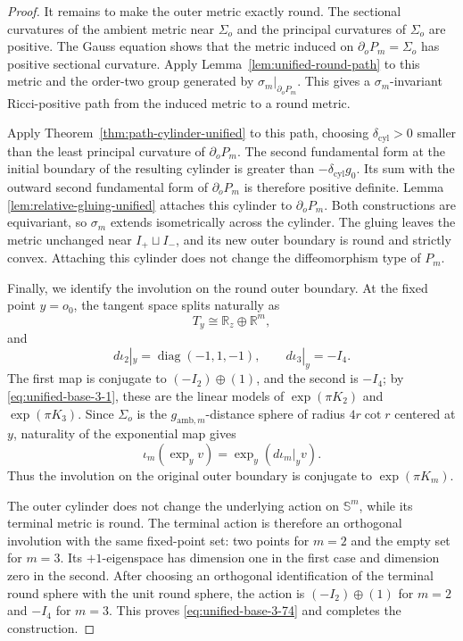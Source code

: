 \documentclass[11pt,reqno]{amsart}
\theoremstyle{definition}
\numberwithin{equation}{section}
\begin{document}
\begin{proof}
It remains to make the outer metric exactly round.  The sectional
curvatures of the ambient metric near $\Sigma_o$ and the principal
curvatures of $\Sigma_o$ are positive.  The Gauss equation shows that
the metric induced on $\partial_oP_m=\Sigma_o$ has positive sectional
curvature.  Apply Lemma~\ref{lem:unified-round-path} to this metric and
the order-two group generated by $\sigma_m|_{\partial_oP_m}$.  This
gives a $\sigma_m$-invariant Ricci-positive path from the induced metric
to a round metric.

Apply Theorem~\ref{thm:path-cylinder-unified} to this path, choosing
$\delta_{\mathrm{cyl}}>0$ smaller than the least principal curvature of
$\partial_oP_m$.  The second fundamental form at the initial boundary
of the resulting cylinder is greater than
$-\delta_{\mathrm{cyl}}g_0$.  Its sum with the outward second fundamental form of
$\partial_oP_m$ is therefore positive definite.  Lemma
\ref{lem:relative-gluing-unified} attaches this cylinder to
$\partial_oP_m$.  Both constructions are equivariant, so $\sigma_m$
extends isometrically across the cylinder.  The gluing leaves the metric
unchanged near $I_+\sqcup I_-$, and its new outer boundary is round and
strictly convex.  Attaching this cylinder does not change the diffeomorphism type of $P_m$.

Finally, we identify the involution on the round outer boundary.  At
the fixed point $y=o_0$, the tangent space splits naturally as
\[
                         T_y\cong\mathbb R_z\oplus\mathbb R^m,
\]
and
\begin{equation}
d\iota_2|_y=\operatorname{diag}(-1,1,-1),\qquad
 d\iota_3|_y=-I_4.                                                \label{eq:unified-base-3-81}
\end{equation}
The first map is conjugate to $(-I_2)\oplus(1)$, and the second is
$-I_4$; by \eqref{eq:unified-base-3-1}, these are the linear models of
$\exp(\pi K_2)$ and $\exp(\pi K_3)$.  Since $\Sigma_o$ is the
$g_{\mathrm{amb},m}$-distance sphere of radius $4r\cot r$ centered at
$y$, naturality of the exponential map gives
\[
 \iota_m(\exp_y v)=\exp_y(d\iota_m|_y v).
\]
Thus the involution on the original outer boundary is conjugate to
$\exp(\pi K_m)$.

The outer cylinder does not change the underlying action on
$\mathbb S^m$, while its terminal metric is round.  The terminal action
is therefore an orthogonal involution with the same fixed-point set:
two points for $m=2$ and the empty set for $m=3$.  Its $+1$-eigenspace
has dimension one in the first case and dimension zero in the second.
After choosing an orthogonal identification of the terminal round sphere
with the unit round sphere, the
action is $(-I_2)\oplus(1)$ for $m=2$ and $-I_4$ for $m=3$.  This proves
\eqref{eq:unified-base-3-74} and completes the construction.
\end{proof}
\end{document}
